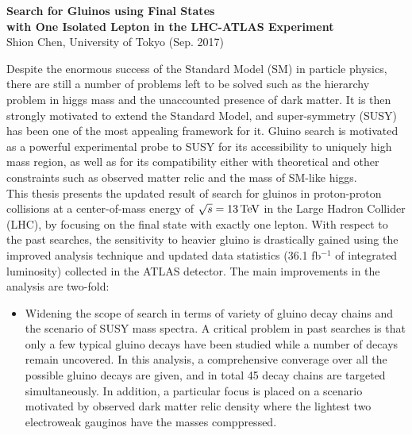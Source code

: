\documentclass {article}
\begin{document}
\begin{center}
\large{\textbf{Search for Gluinos using Final States \\ with One Isolated Lepton in the LHC-ATLAS Experiment}}   \\ Shion Chen, University of Tokyo (Sep. 2017)
\end{center}{



Despite the enormous success of the Standard Model (SM) in particle physics, there are still a number of problems left to be solved such as the hierarchy problem in higgs mass and the unaccounted presence of dark matter.
It is then strongly motivated to extend the Standard Model, and super-symmetry (SUSY) has been one of the most appealing framework for it.
Gluino search is motivated as a powerful experimental probe to SUSY for its accessibility to uniquely high mass region, as well as for its compatibility either with theoretical and other constraints such as observed  matter relic and the mass of SM-like higgs.   \\

This thesis presents the updated result of search for gluinos in proton-proton collisions at a center-of-mass energy of $\sqrt{s}=13\, \mathrm{TeV}$ in the Large Hadron Collider (LHC), 
by focusing on the final state with exactly one lepton. 
With respect to the past searches, the sensitivity to heavier gluino is drastically gained using the improved analysis technique and updated data statistics (36.1 fb$^{-1}$ of integrated luminosity) collected in the ATLAS detector.  The main improvements in the analysis are two-fold: 

\begin{itemize}
\item Widening the scope of search in terms of variety of gluino decay chains and the scenario of SUSY mass spectra.
A critical problem in past searches is that only a few typical gluino decays have been studied while a number of decays remain uncovered.
In this analysis, a comprehensive converage over all the possible gluino decays are given, and in total 45 decay chains are targeted simultaneously.
In addition, a particular focus is placed on a scenario motivated by observed dark matter relic density where the lightest two electroweak gauginos have the masses comppressed.


\end{itemize}}
\end{document}
